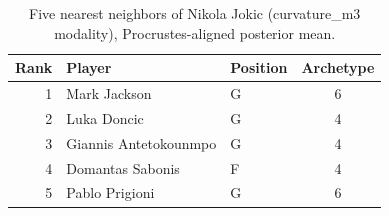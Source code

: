 \begin{table}[htbp]
  \centering\small
  \begin{tabular}{rllc}
    \toprule
    Rank & Player & Position & Archetype \\
    \midrule
    1 & Mark Jackson & G & 6 \\
    2 & Luka Doncic & G & 4 \\
    3 & Giannis Antetokounmpo & G & 4 \\
    4 & Domantas Sabonis & F & 4 \\
    5 & Pablo Prigioni & G & 6 \\
    \bottomrule
  \end{tabular}
  \caption{Five nearest neighbors of Nikola Jokic (curvature_m3 modality), Procrustes-aligned posterior mean.}
  \label{tab:Nikola_Jokic_neighbors_curvature_m3}
\end{table}

